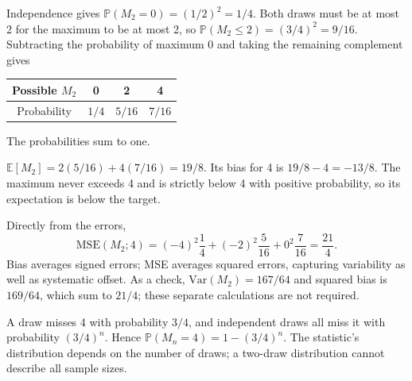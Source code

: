 \documentclass[11pt]{article}
\begin{document}
\begin{parts}
\item Independence gives $\mathbb P(M_2=0)=(1/2)^2=1/4$. Both draws must be at most 2 for the maximum to be at most 2, so $\mathbb P(M_2\leq2)=(3/4)^2=9/16$. Subtracting the probability of maximum 0 and taking the remaining complement gives
\begin{center}\begin{tabular}{c|ccc}\toprule
Possible $M_2$ & 0 & 2 & 4\\\midrule
Probability & $1/4$ & $5/16$ & $7/16$\\\bottomrule
\end{tabular}\end{center}
The probabilities sum to one.
\item $\mathbb E[M_2]=2(5/16)+4(7/16)=19/8$. Its bias for 4 is $19/8-4=-13/8$. The maximum never exceeds 4 and is strictly below 4 with positive probability, so its expectation is below the target.
\item Directly from the errors,
\[
\mathrm{MSE}(M_2;4)=(-4)^2\frac14+(-2)^2\frac5{16}+0^2\frac7{16}=\frac{21}4.
\]
Bias averages signed errors; MSE averages squared errors, capturing variability as well as systematic offset. As a check, $\mathrm{Var}(M_2)=167/64$ and squared bias is $169/64$, which sum to $21/4$; these separate calculations are not required.
\item A draw misses 4 with probability $3/4$, and independent draws all miss it with probability $(3/4)^n$. Hence $\mathbb P(M_n=4)=1-(3/4)^n$. The statistic's distribution depends on the number of draws; a two-draw distribution cannot describe all sample sizes.
\end{parts}
\end{document}
